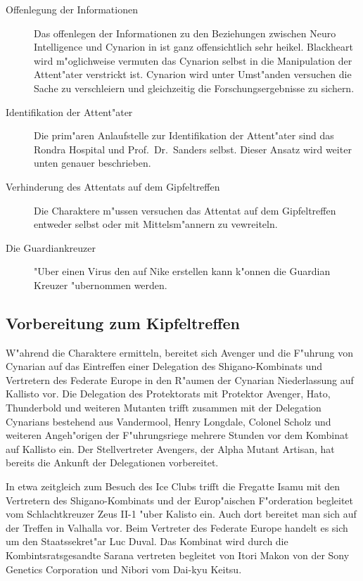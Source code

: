 \begin{description}
	\item[Offenlegung der Informationen] Das offenlegen der Informationen zu den Beziehungen zwischen Neuro Intelligence und Cynarion in 		ist ganz offensichtlich sehr heikel. Blackheart wird m"oglichweise vermuten das Cynarion selbst in die Manipulation der Attent"ater 	verstrickt ist. Cynarion wird unter Umst"anden versuchen die Sache zu verschleiern und gleichzeitig die Forschungsergebnisse zu 		sichern.
	\item[Identifikation der Attent"ater] Die prim"aren Anlaufstelle zur Identifikation der Attent"ater sind das Rondra Hospital und 
		Prof.~Dr.~Sanders selbst. Dieser Ansatz wird weiter unten genauer beschrieben.
	\item[Verhinderung des Attentats auf dem Gipfeltreffen] Die Charaktere m"ussen versuchen das Attentat auf dem Gipfeltreffen entweder selbst oder mit 
		Mittelsm"annern zu vewreiteln.
	\item[Die Guardiankreuzer] "Uber einen Virus den \ml{} auf Nike erstellen kann k"onnen die Guardian Kreuzer "ubernommen werden.
\end{description}

\subsection{Vorbereitung zum Kipfeltreffen}

W"ahrend die Charaktere ermitteln, bereitet sich Avenger und die F"uhrung von Cynarian auf das Eintreffen einer Delegation des Shigano-Kombinats und Vertretern des Federate Europe in den R"aumen der Cynarian Niederlassung auf Kallisto vor. Die Delegation des Protektorats mit Protektor Avenger, Hato, Thunderbold und weiteren Mutanten trifft zusammen mit der Delegation Cynarians bestehend aus Vandermool, Henry Longdale, Colonel Scholz und weiteren Angeh"origen der F"uhrungsriege mehrere Stunden vor dem Kombinat auf Kallisto ein. Der Stellvertreter Avengers, der Alpha Mutant Artisan, hat bereits die Ankunft der Delegationen vorbereitet.

In etwa zeitgleich zum Besuch des Ice Clubs trifft die Fregatte Isamu mit den Vertretern des Shigano-Kombinats und der Europ"aischen F"orderation begleitet vom Schlachtkreuzer Zeus II-1 "uber Kalisto ein. Auch dort bereitet man sich auf der Treffen in Valhalla vor.
Beim Vertreter des Federate Europe handelt es sich um den Staatssekret"ar Luc Duval. Das Kombinat wird durch die Kombintsratsgesandte Sarana vertreten begleitet von Itori Makon von der Sony Genetics Corporation und Nibori vom Dai-kyu Keitsu.

